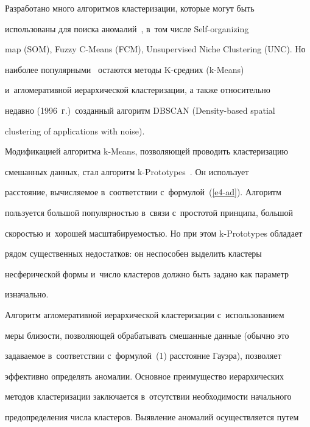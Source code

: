 \vspace*{-3pt}





  Разработано много алгоритмов кластеризации, которые могут быть 


использованы для поиска аномалий~\cite{17-ad}, в~том числе Self-organizing 


map (SOM), Fuzzy C-Means (FCM), Unsupervised Niche Clustering (UNC). Но 


наиболее популярными~\cite{18-ad} остаются методы K-сред\-них (k-Means) 


и~агломеративной иерархической кластеризации, а также относительно 


недавно (1996~г.)\ созданный алгоритм DBSCAN (Density-based spatial 


clustering of applications with noise).


  


  Модификацией алгоритма k-Means, позволяющей проводить кластеризацию 


смешанных данных, стал алгоритм k-Prototypes~\cite{15-ad}. Он использует 


расстояние, вычисляемое в~соответствии с~формулой~(\ref{e4-ad}). Алгоритм 


пользуется большой популярностью в~связи с~простотой принципа, большой 


скоростью и~хорошей масштабируемостью. Но при этом k-Prototypes обладает 


рядом существенных недостатков: он неспособен выделить кластеры 


несферической формы и~число кластеров должно быть задано как параметр 


изначально.


  


  Алгоритм агломеративной иерархической кластеризации с~использованием 


меры близости, позволяющей обрабатывать смешанные данные (обычно это 


задаваемое в~соответствии с~формулой~(1) расстояние Гауэра), позволяет 


эффективно определять аномалии. Основное преимущество иерархических 


методов кластеризации заключается в~отсутствии необходимости начального 


предопределения числа кластеров. Выявление аномалий осуществляется путем 


